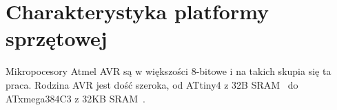 \chapter{Charakterystyka platformy sprzętowej}
\label{cha:hardware}

Mikropocesory Atmel AVR są w większości 8-bitowe i na takich skupia się ta praca. Rodzina AVR jest dość szeroka, od ATtiny4 z 32B SRAM~\cite{Attiny4} do ATxmega384C3 z 32KB SRAM~\cite{Atxmega384}. 

